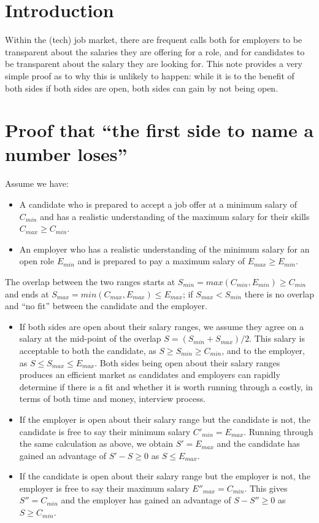 \documentclass[a4paper]{article}
\begin{document}
\renewcommand{\labelitemii}{\labelitemi}

\section{Introduction}

Within the (tech) job market, there are frequent calls both for employers to be transparent about the salaries they are offering for a role, and for candidates to be transparent about the salary they are looking for. This note provides a very simple proof as to why this is unlikely to happen: while it is to the benefit of both sides if both sides are open, both sides can gain by not being open.

\section{Proof that ``the first side to name a number loses''}

Assume we have:

\begin{itemize}
\item A candidate who is prepared to accept a job offer at a minimum salary of $C_{min}$ and has a realistic understanding of the maximum salary for their skills $C_{max} \ge C_{min}$.
\item An employer who has a realistic understanding of the minimum salary for an open role $E_{min}$ and is prepared to pay a maximum salary of $E_{max} \ge E_{min}$.
\end{itemize}

The overlap between the two ranges starts at $S_{min} = max(C_{min}, E_{min}) \ge C_{min}$ and ends at $S_{max} = min(C_{max}, E_{max}) \le E_{max}$; if $S_{max} < S_{min}$ there is no overlap and ``no fit'' between the candidate and the employer.

\begin{itemize}
\item If both sides are open about their salary ranges, we assume they agree on a salary at the mid-point of the overlap $S = (S_{min} + S_{max}) / 2$. This salary is acceptable to both the candidate, as $S \ge S_{min} \ge C_{min}$, and to the employer, as $S \le S_{max} \le E_{max}$. Both sides being open about their salary ranges produces an efficient market as candidates and employers can rapidly determine if there is a fit and whether it is worth running through a costly, in terms of both time and money, interview process.
\item If the employer is open about their salary range but the candidate is not, the candidate is free to say their minimum salary $C'_{min} = E_{max}$. Running through the same calculation as above, we obtain $S' = E_{max}$ and the candidate has gained an advantage of $S' - S \ge 0$ as $S \le E_{max}$.
\item If the candidate is open about their salary range but the employer is not, the employer is free to say their maximum salary $E''_{max} = C_{min}$. This gives $S'' = C_{min}$ and the employer has gained an advantage of $S - S'' \ge 0$ as $S \ge C_{min}$.
\end{itemize}
\end{document}
